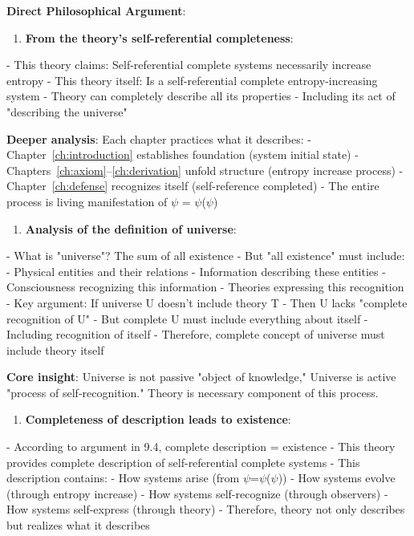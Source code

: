 \textbf{Direct Philosophical Argument}:

\begin{enumerate}
\item \textbf{From the theory's self-referential completeness}:
\end{enumerate}
   - This theory claims: Self-referential complete systems necessarily increase entropy
   - This theory itself: Is a self-referential complete entropy-increasing system
   - Theory can completely describe all its properties
   - Including its act of "describing the universe"
   
   \textbf{Deeper analysis}: Each chapter practices what it describes:
   - Chapter~\ref{ch:introduction} establishes foundation (system initial state)
   - Chapters~\ref{ch:axiom}--\ref{ch:derivation} unfold structure (entropy increase process)
   - Chapter~\ref{ch:defense} recognizes itself (self-reference completed)
   - The entire process is living manifestation of $\psi$ = $\psi$($\psi$)

\begin{enumerate}
\item \textbf{Analysis of the definition of universe}:
\end{enumerate}
   - What is "universe"? The sum of all existence
   - But "all existence" must include:
     - Physical entities and their relations
     - Information describing these entities
     - Consciousness recognizing this information
     - Theories expressing this recognition
   - Key argument: If universe U doesn't include theory T
     - Then U lacks "complete recognition of U"
     - But complete U must include everything about itself
     - Including recognition of itself
   - Therefore, complete concept of universe must include theory itself
   
   \textbf{Core insight}: Universe is not passive "object of knowledge,"
   Universe is active "process of self-recognition."
   Theory is necessary component of this process.

\begin{enumerate}
\item \textbf{Completeness of description leads to existence}:
\end{enumerate}
   - According to argument in 9.4, complete description = existence
   - This theory provides complete description of self-referential complete systems
   - This description contains:
     - How systems arise (from $\psi$=$\psi$($\psi$))
     - How systems evolve (through entropy increase)
     - How systems self-recognize (through observers)
     - How systems self-express (through theory)
   - Therefore, theory not only describes but realizes what it describes
   
